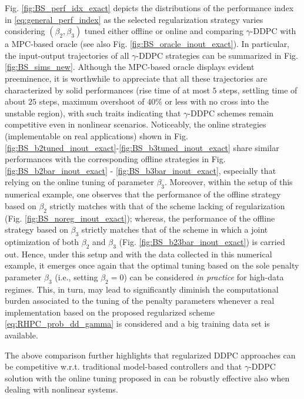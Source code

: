 \documentclass[letterpaper, 10 pt, conference]{ieeeconf}  %
\begin{document}
Fig. \ref{fig:BS_perf_idx_exact} depicts the distributions of the %
performance index in \eqref{eq:general_perf_index} as the selected regularization strategy varies considering $(\beta_2,\beta_3)$ tuned either offline or online and comparing $\gamma$-DDPC with a MPC-based oracle (see also Fig. \ref{fig:BS_oracle_inout_exact}). In particular, the input-output trajectories of all $\gamma$-DDPC strategies can be summarized in Fig. \ref{fig:BS_sims_new}. Although the MPC-based oracle displays evident preeminence, it is worthwhile to appreciate that all these trajectories are characterized by solid performances (rise time of at most $5$ steps, settling time of about $25$ steps, maximum overshoot of $40\%$ or less with no cross into the unstable region), with such traits indicating that $\gamma$-DDPC schemes remain competitive even in nonlinear scenarios. Noticeably, the online strategies (implementable on real applications) shown in Fig. \ref{fig:BS_b2tuned_inout_exact}-\ref{fig:BS_b3tuned_inout_exact} share similar performances with the corresponding offline strategies in Fig. \ref{fig:BS_b2bar_inout_exact} - \ref{fig:BS_b3bar_inout_exact}, especially that relying on the online tuning of parameter $\beta_3$. Moreover, within the setup of this numerical example, one observes that the performance of the offline strategy based on $\beta_2$ strictly matches with that of the scheme lacking of regularization (Fig. \ref{fig:BS_noreg_inout_exact}); whereas, the performance of the offline strategy based on $\beta_3$ strictly matches that of the scheme in which a joint optimization of both $\beta_2$ and $\beta_3$ (Fig. \ref{fig:BS_b23bar_inout_exact}) is carried out. Hence, under this setup and with the data collected in this numerical example, it emerges once again that the optimal tuning based on the sole penalty parameter $\beta_3$ (i.e., setting $\beta_2 = 0$) can be considered \textit{in practice} for high-data regimes. This, in turn, may lead to significantly diminish the computational burden associated to the tuning of the penalty parameters whenever a real implementation based on the proposed regularized scheme \eqref{eq:RHPC_prob_dd_gamma} is considered and a big training data set is available.



The above comparison further highlights that regularized DDPC approaches can be competitive w.r.t. traditional model-based controllers and that $\gamma$-DDPC solution with the online tuning proposed in \cite{breschi2022uncertainty} can be robustly effective also when dealing with nonlinear systems.
\end{document}
